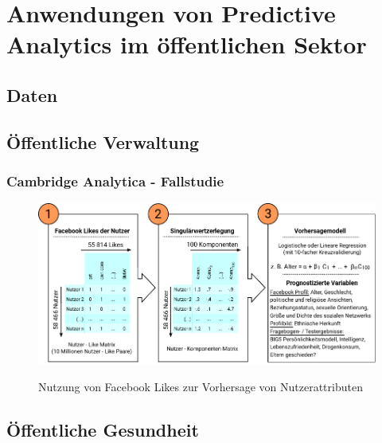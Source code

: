 \documentclass[12pt,a4paper,listof=totoc,oneside]{scrreprt}
\begin{document}
\section{Anwendungen von Predictive Analytics im öffentlichen Sektor}


\subsection{Daten}


\subsection{Öffentliche Verwaltung}


\subsubsection{Cambridge Analytica - Fallstudie}

\begin{figure}%
\centering
\caption{Nutzung von Facebook Likes zur Vorhersage von Nutzerattributen}
\includegraphics[scale=1.0]{Grafiken/Facebook_Likes_Ink.pdf} 
\label{pic:Like_Matrix}
\end{figure}

\subsection{Öffentliche Gesundheit}
\end{document}
